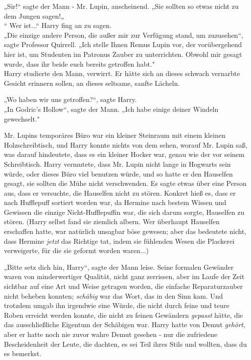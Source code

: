 {„Sir!“ sagte der Mann - Mr. Lupin, anscheinend. „Sie sollten so etwas nicht zu dem Jungen sagen!„\\ “ Wer ist...“ Harry fing an zu sagen.\\ „Die einzige andere Person, die außer mir zur Verfügung stand, um zuzusehen“, sagte Professor Quirrell. „Ich stelle Ihnen Remus Lupin vor, der vorübergehend hier ist, um Studenten im Patronus Zauber zu unterrichten. Obwohl mir gesagt wurde, dass ihr beide euch bereits getroffen habt."\\ Harry studierte den Mann, verwirrt. Er hätte sich an dieses schwach vernarbte Gesicht erinnern sollen, an dieses seltsame, sanfte Lächeln.

„Wo haben wir uns getroffen?“, sagte Harry.\\ „In Godric's Hollow“, sagte der Mann. „Ich habe einige deiner Windeln gewechselt."

Mr. Lupins temporäres Büro war ein kleiner Steinraum mit einem kleinen Holzschreibtisch, und Harry konnte nichts von dem sehen, worauf Mr. Lupin saß, was darauf hindeutete, dass es ein kleiner Hocker war, genau wie der vor seinem Schreibtisch. Harry vermutete, dass Mr. Lupin nicht lange in Hogwarts sein würde, oder dieses Büro viel benutzen würde, und so hatte er den Hauselfen gesagt, sie sollten die Mühe nicht verschwenden. Es sagte etwas über eine Person aus, dass er versuchte, die Hauselfen nicht zu stören. Konkret hieß es, dass er nach Hufflepuff sortiert worden war, da Hermine nach bestem Wissen und Gewissen die einzige Nicht-Hufflepuffin war, die sich darum sorgte, Hauselfen zu stören. (Harry selbst fand sie ziemlich albern. Wer überhaupt Hauselfen erschaffen hatte, war natürlich unsagbar böse gewesen; aber das bedeutete nicht, dass Hermine \emph{jetzt} das Richtige tat, indem sie fühlenden Wesen die Plackerei verweigerte, für die sie geformt worden waren...)

„Bitte setz dich hin, Harry“, sagte der Mann leise. Seine formalen Gewänder waren von minderwertiger Qualität, nicht ganz zerrissen, aber im Laufe der Zeit sichtbar auf eine Art und Weise getragen worden, die einfache Reparaturzauber nicht beheben konnten; \emph{schäbig} war das Wort, das in den Sinn kam. Und trotzdem umgab ihn irgendwie eine Würde, die nicht durch feine und teure Roben erreicht werden konnte, die nicht zu feinen Gewändern \emph{gepasst} hätte, die das ausschließliche Eigentum der Schäbigen war. Harry hatte von Demut \emph{gehört}, aber er hatte noch nie zuvor wahre Demut gesehen - nur die zufriedene Bescheidenheit der Leute, die dachten, es sei Teil ihres Stils und wollten, dass du es bemerkst.

}
